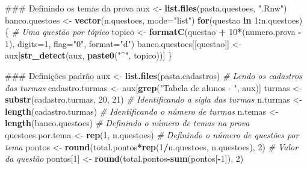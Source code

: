 \documentclass[a4paper]{report}
\newenvironment{Shaded}{\begin{snugshade}}{\end{snugshade}}
\newcommand{\KeywordTok}[1]{\textcolor[rgb]{0.13,0.29,0.53}{\textbf{#1}}}
\newcommand{\DataTypeTok}[1]{\textcolor[rgb]{0.13,0.29,0.53}{#1}}
\newcommand{\DecValTok}[1]{\textcolor[rgb]{0.00,0.00,0.81}{#1}}
\newcommand{\StringTok}[1]{\textcolor[rgb]{0.31,0.60,0.02}{#1}}
\newcommand{\CommentTok}[1]{\textcolor[rgb]{0.56,0.35,0.01}{\textit{#1}}}
\newcommand{\ControlFlowTok}[1]{\textcolor[rgb]{0.13,0.29,0.53}{\textbf{#1}}}
\newcommand{\OperatorTok}[1]{\textcolor[rgb]{0.81,0.36,0.00}{\textbf{#1}}}
\newcommand{\NormalTok}[1]{#1}
\begin{document}
\begin{Shaded}
\begin{Highlighting}[]
\NormalTok{### Definindo os temas da prova}
\NormalTok{aux <-}\StringTok{ }\KeywordTok{list.files}\NormalTok{(pasta.questoes, }\StringTok{".Rnw"}\NormalTok{)}
\NormalTok{banco.questoes <-}\StringTok{ }\KeywordTok{vector}\NormalTok{(n.questoes, }\DataTypeTok{mode=}\StringTok{"list"}\NormalTok{)}
\ControlFlowTok{for}\NormalTok{(questao }\ControlFlowTok{in} \DecValTok{1}\OperatorTok{:}\NormalTok{n.questoes) \{  }\CommentTok{# Uma questão por tópico}
\NormalTok{  topico <-}\StringTok{ }\KeywordTok{formatC}\NormalTok{(questao }\OperatorTok{+}\StringTok{ }\DecValTok{10}\OperatorTok{*}\NormalTok{(numero.prova }\OperatorTok{-}\StringTok{ }\DecValTok{1}\NormalTok{), }\DataTypeTok{digits=}\DecValTok{1}\NormalTok{, }\DataTypeTok{flag=}\StringTok{"0"}\NormalTok{, }\DataTypeTok{format=}\StringTok{"d"}\NormalTok{)}
\NormalTok{  banco.questoes[[questao]] <-}\StringTok{ }\NormalTok{aux[}\KeywordTok{str_detect}\NormalTok{(aux, }\KeywordTok{paste0}\NormalTok{(}\StringTok{"^"}\NormalTok{, topico))]}
\NormalTok{\}}
\end{Highlighting}
\end{Shaded}

\begin{Shaded}
\begin{Highlighting}[]
\NormalTok{### Definições padrão}
\NormalTok{aux <-}\StringTok{ }\KeywordTok{list.files}\NormalTok{(pasta.cadastros)  }\CommentTok{# Lendo os cadastros das turmas}
\NormalTok{cadastro.turmas <-}\StringTok{ }\NormalTok{aux[}\KeywordTok{grep}\NormalTok{(}\StringTok{"Tabela de alunos - "}\NormalTok{, aux)]}
\NormalTok{turmas <-}\StringTok{ }\KeywordTok{substr}\NormalTok{(cadastro.turmas, }\DecValTok{20}\NormalTok{, }\DecValTok{21}\NormalTok{)  }\CommentTok{# Identificando a sigla das turmas}
\NormalTok{n.turmas <-}\StringTok{ }\KeywordTok{length}\NormalTok{(cadastro.turmas)  }\CommentTok{# Identificando o número de turmas}
\NormalTok{n.temas <-}\StringTok{ }\KeywordTok{length}\NormalTok{(banco.questoes) }\CommentTok{# Definindo o número de temas na prova}
\NormalTok{questoes.por.tema <-}\StringTok{ }\KeywordTok{rep}\NormalTok{(}\DecValTok{1}\NormalTok{, n.questoes)  }\CommentTok{# Definindo o número de questões por tema}
\NormalTok{pontos <-}\StringTok{ }\KeywordTok{round}\NormalTok{(total.pontos}\OperatorTok{*}\KeywordTok{rep}\NormalTok{(}\DecValTok{1}\OperatorTok{/}\NormalTok{n.questoes, n.questoes), }\DecValTok{2}\NormalTok{)  }\CommentTok{# Valor da questão}
\NormalTok{pontos[}\DecValTok{1}\NormalTok{] <-}\StringTok{ }\KeywordTok{round}\NormalTok{(total.pontos}\OperatorTok{-}\KeywordTok{sum}\NormalTok{(pontos[}\OperatorTok{-}\DecValTok{1}\NormalTok{]), }\DecValTok{2}\NormalTok{)}
\end{Highlighting}
\end{Shaded}
\end{document}
